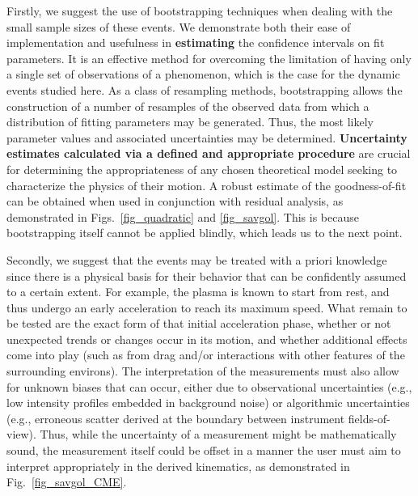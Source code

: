 \documentclass[structabstract]{aa}
\begin{document}
Firstly, we suggest the use of bootstrapping techniques when dealing with the small sample sizes of these events. We demonstrate both their ease of implementation and usefulness in {\bf estimating} the confidence intervals on fit parameters. It is an effective method for overcoming the limitation of having only a single set of observations of a phenomenon, which is the case for the dynamic events studied here. As a class of resampling methods, bootstrapping allows the construction of a number of resamples of the observed data from which a distribution of fitting parameters may be generated. Thus, the most likely parameter values and associated uncertainties may be determined. {\bf Uncertainty estimates calculated via a defined and appropriate procedure} are crucial for determining the appropriateness of any chosen theoretical model seeking to characterize the physics of their motion. A robust estimate of the goodness-of-fit can be obtained when used in conjunction with residual analysis, as demonstrated in Figs.~\ref{fig_quadratic} and \ref{fig_savgol}. This is because bootstrapping itself cannot be applied blindly, which leads us to the next point.

Secondly, we suggest that the events may be treated with a priori knowledge since there is a physical basis for their behavior that can be confidently assumed to a certain extent. For example, the plasma is known to start from rest, and thus undergo an early acceleration to reach its maximum speed. What remain to be tested are the exact form of that initial acceleration phase, whether or not unexpected trends or changes occur in its motion, and whether additional effects come into play (such as from drag and/or interactions with other features of the surrounding environs). The interpretation of the measurements must also allow for unknown biases that can occur, either due to observational uncertainties (e.g., low intensity profiles embedded in background noise) or algorithmic uncertainties (e.g., erroneous scatter derived at the boundary between instrument fields-of-view). Thus, while the uncertainty of a measurement might be mathematically sound, the measurement itself could be offset in a manner the user must aim to interpret appropriately in the derived kinematics, as demonstrated in Fig.~\ref{fig_savgol_CME}.
\end{document}
